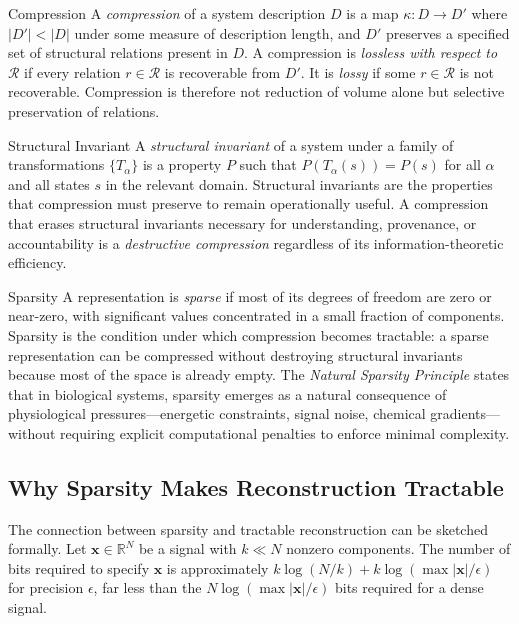 \begin{definition}{Compression}
A \emph{compression} of a system description $D$ is a map $\kappa: D \to D'$ where
$|D'| < |D|$ under some measure of description length, and $D'$ preserves a specified
set of structural relations present in $D$. A compression is \emph{lossless with
respect to} $\mathcal{R}$ if every relation $r \in \mathcal{R}$ is recoverable from
$D'$. It is \emph{lossy} if some $r \in \mathcal{R}$ is not recoverable. Compression
is therefore not reduction of volume alone but selective preservation of relations.
\end{definition}

\begin{definition}{Structural Invariant}
A \emph{structural invariant} of a system under a family of transformations
$\{T_\alpha\}$ is a property $P$ such that $P(T_\alpha(s)) = P(s)$ for all $\alpha$
and all states $s$ in the relevant domain. Structural invariants are the properties
that compression must preserve to remain operationally useful. A compression that
erases structural invariants necessary for understanding, provenance, or accountability
is a \emph{destructive compression} regardless of its information-theoretic efficiency.
\end{definition}

\begin{definition}{Sparsity}
A representation is \emph{sparse} if most of its degrees of freedom are zero or
near-zero, with significant values concentrated in a small fraction of components.
Sparsity is the condition under which compression becomes tractable: a sparse
representation can be compressed without destroying structural invariants because
most of the space is already empty. The \emph{Natural Sparsity Principle} states
that in biological systems, sparsity emerges as a natural consequence of
physiological pressures---energetic constraints, signal noise, chemical
gradients---without requiring explicit computational penalties to enforce minimal
complexity.
\end{definition}

\subsection*{Why Sparsity Makes Reconstruction Tractable}

The connection between sparsity and tractable reconstruction can be sketched
formally. Let $\mathbf{x} \in \mathbb{R}^N$ be a signal with $k \ll N$ nonzero
components. The number of bits required to specify $\mathbf{x}$ is approximately
$k \log(N/k) + k \log(\max|\mathbf{x}|/\epsilon)$ for precision $\epsilon$, far
less than the $N \log(\max|\mathbf{x}|/\epsilon)$ bits required for a dense signal.


